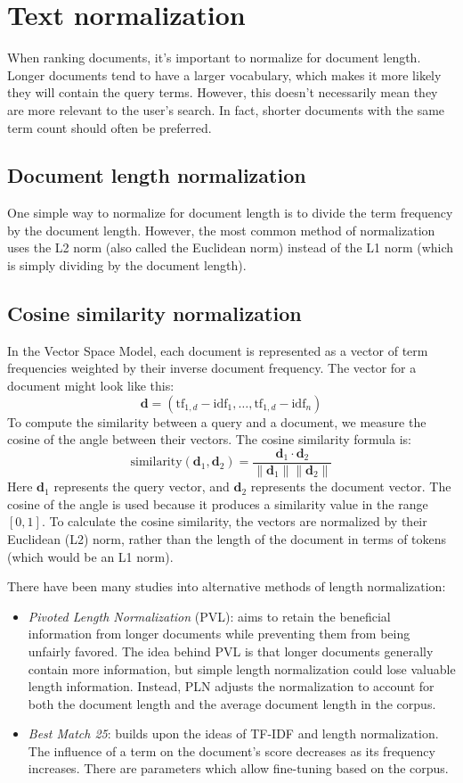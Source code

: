 \section{Text normalization}

When ranking documents, it's important to normalize for document length. 
Longer documents tend to have a larger vocabulary, which makes it more likely they will contain the query terms.
However, this doesn't necessarily mean they are more relevant to the user's search. In fact, shorter documents with the same term count should often be preferred.

\subsection{Document length normalization}
One simple way to normalize for document length is to divide the term frequency by the document length. 
However, the most common method of normalization uses the L2 norm (also called the Euclidean norm) instead of the L1 norm (which is simply dividing by the document length).

\subsection{Cosine similarity normalization}
In the Vector Space Model, each document is represented as a vector of term frequencies weighted by their inverse document frequency. 
The vector for a document might look like this:
\[\mathbf{d}=(\text{tf}_{1,d}-\text{idf}_1,\dots,\text{tf}_{1,d}-\text{idf}_n)\]
\noindent To compute the similarity between a query and a document, we measure the cosine of the angle between their vectors. 
The cosine similarity formula is:
\[\text{similarity}(\mathbf{d}_1,\mathbf{d}_2)=\dfrac{\mathbf{d}_1\cdot\mathbf{d}_2}{\left\lVert \mathbf{d}_1\right\rVert\left\lVert \mathbf{d}_2\right\rVert  }\]
Here $\mathbf{d}_1$ represents the query vector, and $\mathbf{d}_2$ represents the document vector.
The cosine of the angle is used because it produces a similarity value in the range $[0,1]$. 
To calculate the cosine similarity, the vectors are normalized by their Euclidean (L2) norm, rather than the length of the document in terms of tokens (which would be an L1 norm).

There have been many studies into alternative methods of length normalization: 
\begin{itemize}
    \item \textit{Pivoted Length Normalization} (PVL): aims to retain the beneficial information from longer documents while preventing them from being unfairly favored. 
        The idea behind PVL is that longer documents generally contain more information, but simple length normalization could lose valuable length information. 
        Instead, PLN adjusts the normalization to account for both the document length and the average document length in the corpus. 
    \item \textit{Best Match 25}: builds upon the ideas of TF-IDF and length normalization. 
        The influence of a term on the document's score decreases as its frequency increases. 
        There are parameters which allow fine-tuning based on the corpus.
\end{itemize}